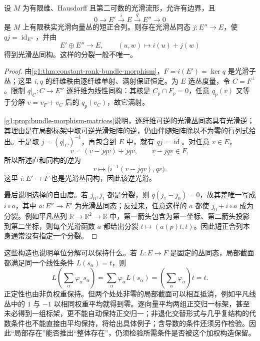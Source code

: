\begin{theorem}\label{g1:thm:exact-bundle-splitting}
	设 \(M\) 为有限维、Hausdorff 且第二可数的光滑流形，允许有边界，且
	\[
		0\longrightarrow E'\xrightarrow{\ i\ }E\xrightarrow{\ q\ }E''\longrightarrow0
	\]
	是 \(M\) 上有限秩实光滑向量丛的短正合列。则存在光滑丛同态 \(j:E''\to E\)，使 \(qj=\operatorname{id}_{E''}\)，并由
	\[
		E'\oplus E''\longrightarrow E,\qquad (u,w)\longmapsto i(u)+j(w)
	\]
	得到光滑丛同构。这样的分裂一般不唯一。
\end{theorem}
\begin{proof}
	由\cref{g1:thm:constant-rank-bundle-morphism}，\(F=i(E')=\ker q\) 是光滑子丛；这里 \(i,q\) 的纤维秩由逐纤维单射、满射保证恒定。为 \(E\) 选丛度量，令 \(C=F^\perp\)。限制 \(q|_C:C\to E''\) 逐纤维为线性同构：其核是 \(C_p\cap F_p=0\)，任意 \(q_p(v)\) 又等于分解 \(v=v_F+v_C\) 后的 \(q_p(v_C)\)，故它满射。

	\cref{g1:prop:bundle-morphism-matrices}说明，逐纤维可逆的光滑丛同态具有光滑逆；其理由是在局部标架中取可逆光滑矩阵的逆，仍由伴随矩阵除以不为零的行列式给出。于是取 \(j=(q|_C)^{-1}\)，再包含到 \(E\) 中，就有 \(qj=\operatorname{id}\)。对任意 \(v\in E\)，
	\[
		v=(v-jqv)+jqv,\qquad v-jqv\in F,
	\]
	所以所述直和同构的逆为
	\[
		v\longmapsto\bigl(i^{-1}(v-jqv),qv\bigr).
	\]
	这里 \(i:E'\to F\) 也是光滑丛同构，因此该逆光滑。

	最后说明选择的自由度。若 \(j_0,j_1\) 都是分裂，则 \(q(j_1-j_0)=0\)，故其差唯一写成 \(i\circ a\)，其中 \(a:E''\to E'\) 为光滑丛同态；反过来，任意这样的 \(a\) 都使 \(j_0+i\circ a\) 成为分裂。例如平凡丛列 \(\mathbb R\to\mathbb R^2\to\mathbb R\) 中，第一箭头包含为第一坐标、第二箭头投影到第二坐标，则每个光滑函数 \(a\) 都给出分裂 \(t\mapsto(a(p)t,t)\)。因此短正合列本身通常没有指定一个分裂。
\end{proof}

这些构造也说明单位分解可以保持什么。若 \(L:E\to F\) 是固定的丛同态，局部截面都满足同一个线性条件 \(L(s_\alpha)=t\)，则
\[
	L\!\left(\sum_\alpha\varphi_\alpha s_\alpha\right)
	=\sum_\alpha\varphi_\alpha L(s_\alpha)
	=\left(\sum_\alpha\varphi_\alpha\right)t=t.
\]
正定性也由非负权重保持。但两个处处非零的局部截面可以相互抵消，例如平凡线丛中的 \(1\) 与 \(-1\) 以相同权重平均就得到零。逐向量平均两组正交归一标架，甚至未必得到一组标架，更不能自动保持正交归一；非退化交替形式与几乎复结构的代数条件也不能直接由平均保持，将给出具体例子；含导数的条件还须另作检验。因此“局部存在”能否推出“整体存在”，仍须检验所需条件是否被这个加权构造保留。

